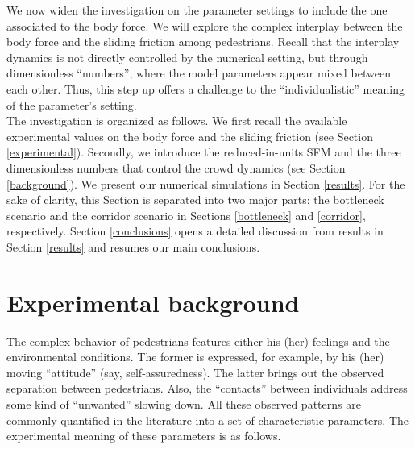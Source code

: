\documentclass[preprint,12pt]{elsarticle}
\begin{document}
We now widen the investigation on the parameter settings to include the one 
associated to the body force. We will  explore 
 the complex interplay between 
the body force and the sliding friction among pedestrians. Recall that the 
interplay dynamics is not directly controlled by the numerical setting, but 
through dimensionless ``numbers'', where the model parameters appear mixed 
between each other. Thus, this step up offers a challenge to the 
``individualistic'' meaning of the parameter's setting. \\  


The investigation is organized as follows. We first recall the available 
experimental values on the body force and the sliding friction (see Section 
\ref{experimental}). Secondly, we introduce the reduced-in-units SFM and the 
three dimensionless numbers that control the crowd dynamics (see Section 
\ref{background}). We present our numerical simulations in Section 
\ref{results}. For the sake of clarity, this Section is 
separated into two major parts: the bottleneck scenario and the corridor 
scenario in Sections \ref{bottleneck} and \ref{corridor}, respectively. 
Section \ref{conclusions} opens a detailed discussion from results in Section \ref{results}
and resumes our main conclusions.

\section{\label{experimental}Experimental background}

The complex behavior of pedestrians features
 either his (her) feelings and 
the environmental conditions. The former is expressed, for example, by his 
(her) moving ``attitude'' (say, self-assuredness). The latter brings out the 
observed separation between pedestrians. Also, the ``contacts'' between 
individuals address some kind of ``unwanted'' slowing down. All these 
observed patterns are commonly quantified in the literature into a set of 
characteristic  parameters. The experimental meaning of these parameters is as 
follows.
\end{document}
